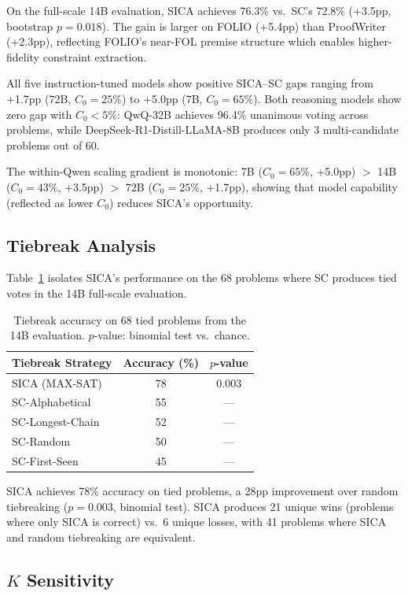 \documentclass[11pt,a4paper]{article}
\begin{document}
On the full-scale 14B evaluation, SICA achieves 76.3\% vs.\ SC's 72.8\% (+3.5pp, bootstrap $p=0.018$). The gain is larger on FOLIO (+5.4pp) than ProofWriter (+2.3pp), reflecting FOLIO's near-FOL premise structure which enables higher-fidelity constraint extraction.

All five instruction-tuned models show positive SICA--SC gaps ranging from +1.7pp (72B, $C_0=25\%$) to +5.0pp (7B, $C_0=65\%$). Both reasoning models show zero gap with $C_0<5\%$: QwQ-32B achieves 96.4\% unanimous voting across problems, while DeepSeek-R1-Distill-LLaMA-8B produces only 3 multi-candidate problems out of 60.

The within-Qwen scaling gradient is monotonic: 7B ($C_0=65\%$, +5.0pp) $>$ 14B ($C_0=43\%$, +3.5pp) $>$ 72B ($C_0=25\%$, +1.7pp), showing that model capability (reflected as lower $C_0$) reduces SICA's opportunity.

\subsection{Tiebreak Analysis}
\label{sec:tiebreak}

Table~\ref{tab:tiebreak} isolates SICA's performance on the 68 problems where SC produces tied votes in the 14B full-scale evaluation.

\begin{table}[t]
\centering
\small
\caption{Tiebreak accuracy on 68 tied problems from the 14B evaluation. $p$-value: binomial test vs.\ chance.}
\label{tab:tiebreak}
\begin{tabular}{lcc}
\toprule
\textbf{Tiebreak Strategy} & \textbf{Accuracy (\%)} & \textbf{$p$-value} \\
\midrule
SICA (MAX-SAT) & 78 & 0.003 \\
SC-Alphabetical & 55 & --- \\
SC-Longest-Chain & 52 & --- \\
SC-Random & 50 & --- \\
SC-First-Seen & 45 & --- \\
\bottomrule
\end{tabular}
\end{table}

SICA achieves 78\% accuracy on tied problems, a 28pp improvement over random tiebreaking ($p=0.003$, binomial test). SICA produces 21 unique wins (problems where only SICA is correct) vs.\ 6 unique losses, with 41 problems where SICA and random tiebreaking are equivalent.

\subsection{$K$ Sensitivity}
\label{sec:k_sensitivity}
\end{document}
